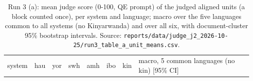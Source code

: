 \begin{table}[t]
\centering
\scriptsize
\setlength{\tabcolsep}{3pt}
\caption{Run 3 (a): mean judge score (0-100, QE prompt) of the judged aligned units (a block counted once), per system and language; macro over the five languages common to all systems (no Kinyarwanda) and over all six, with document-cluster 95\% bootstrap intervals. Source: \texttt{reports/data/judge\_j2\_2026-10-25/run3\_table\_a\_unit\_means.csv}.}
\label{tab:t_judge_j2_run3_means}
{\def\LTcaptype{none} %
\begin{tabular}{@{}
  >{\raggedright\arraybackslash}p{}
  >{\raggedleft\arraybackslash}p{}
  >{\raggedleft\arraybackslash}p{}
  >{\raggedleft\arraybackslash}p{}
  >{\raggedleft\arraybackslash}p{}
  >{\raggedleft\arraybackslash}p{}
  >{\raggedleft\arraybackslash}p{}
  >{\raggedleft\arraybackslash}p{}
  >{\raggedleft\arraybackslash}p{}@{}}
\toprule
\begin{minipage}[b]{\linewidth}\raggedright
system
\end{minipage} & \begin{minipage}[b]{\linewidth}\raggedleft
hau
\end{minipage} & \begin{minipage}[b]{\linewidth}\raggedleft
yor
\end{minipage} & \begin{minipage}[b]{\linewidth}\raggedleft
swh
\end{minipage} & \begin{minipage}[b]{\linewidth}\raggedleft
amh
\end{minipage} & \begin{minipage}[b]{\linewidth}\raggedleft
ibo
\end{minipage} & \begin{minipage}[b]{\linewidth}\raggedleft
kin
\end{minipage} & \begin{minipage}[b]{\linewidth}\raggedleft
macro, 5 common languages (no kin) {[}95\% CI{]}
\end{minipage} & \begin{minipage}[b]{\linewidth}\raggedleft

\end{minipage}
\end{tabular}}
\end{table}
